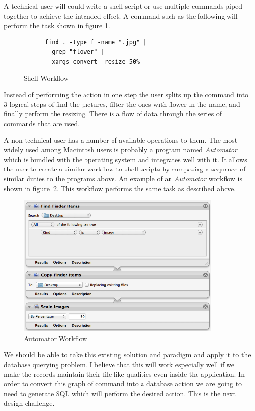 A technical user will could write a shell script or use multiple commands
piped together to achieve the intended effect. A command such as the following
will perform the task shown in figure \ref{fig:shell}.

\begin{figure}[ht!]
  \centering
	\begin{verbatim}
	  find . -type f -name ".jpg" |
	    grep "flower" |
	    xargs convert -resize 50%
	\end{verbatim}
  \caption{Shell Workflow}
  \label{fig:shell}
\end{figure}

Instead of performing the action in one step the user splits up the command
into 3 logical steps of find the pictures, filter the ones with flower in the
name, and finally perform the resizing. There is a flow of data through the
series of commands that are used.

A non-technical user has a number of available operations to them. The most
widely used among Macintosh users is probably a program named \emph{Automator}
which is bundled with the operating system and integrates well with it. It
allows the user to create a similar workflow to shell scripts by composing
a sequence of similar duties to the programs above. An example of an
\emph{Automator} workflow is shown in figure~\ref{fig:automator}. This workflow
performs the same task as described above.

\begin{figure}[ht!]
  \centering
  \includegraphics[width=0.9\textwidth]{images/automator}
  \caption{Automator Workflow}
  \label{fig:automator}
\end{figure}

We should be able to take this existing solution and paradigm and apply it to
the database querying problem. I believe that this will work especially well if
we make the records maintain their file-like qualities even inside the
application. In order to convert this graph of command into a database action
we are going to need to generate \ac{SQL} which will perform the desired
action. This is the next design challenge.


